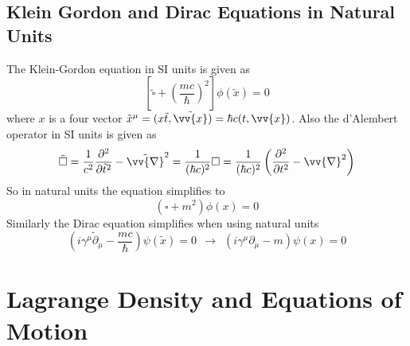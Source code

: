 \documentclass{include/thesisclass}
\newcommand{\vx}{\vv{x}}
\newcommand{\df}{\rightarrow}
\newcommand{\p}{\partial}
\newcommand{\vn}{\vv{\nabla}}
\begin{document}
\subsection{Klein Gordon and Dirac Equations in Natural Units}
The Klein-Gordon equation in SI units is given as
\[
\left[ \tilde{\square} + \left( \frac{mc}{\hbar}\right)^2 \right] \phi(\tilde{x}) = 0
\]
where $x$ is a four vector $\tilde{x}^\mu = ( x \tilde{t}, \tilde{\vx}) = \hbar c (t , \vx)$. Also the d'Alembert operator in SI units is given as
\[ 
\tilde{\square} = \frac{1}{c^2} \frac{\p^2}{\p \tilde{t}^2} - \tilde{\vn}^2 = \frac{1}{(\hbar c)^2} \square = \frac{1}{(\hbar c)^2} \left( \frac{\p^2}{\p t^2} - \vn^2 \right)
\]
So in natural units the equation simplifies to 
\[ ( \square + m^2 ) \phi(x) = 0\]
\newline
Similarly the Dirac equation simplifies when using natural units
\[
\left( i \gamma^\mu \tilde{\p}_\mu - \frac{m c}{\hbar}\right) \psi(\tilde{x}) = 0 ~~\df~~ (i \gamma^\mu \p_\mu - m ) \psi(x) = 0
\]

\section{Lagrange Density and Equations of Motion}
\end{document}
